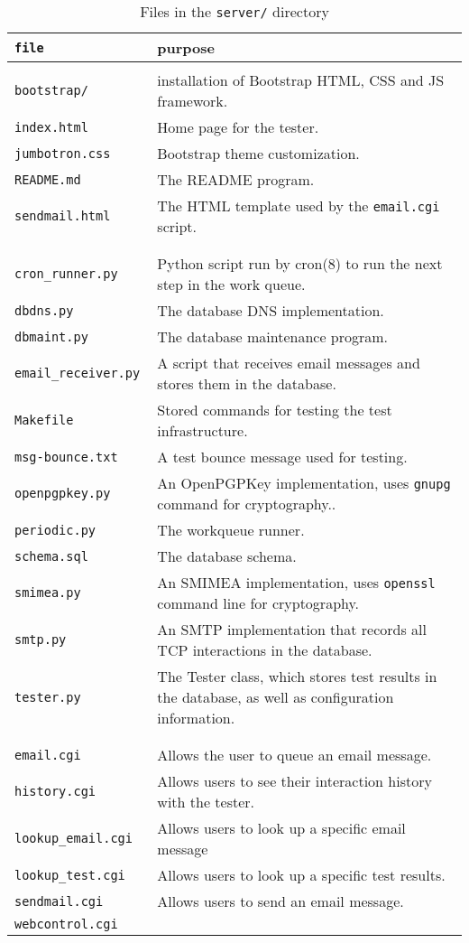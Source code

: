\documentclass[preprint,3p,11pt]{elsarticle}
\begin{document}
\begin{table*}
\begin{tabularx}{\textwidth}{|>{\tt}lX|}
\hline
\textrm{file} & purpose\\
\hline
\multicolumn{2}{|l|}{\textbf{HTML files:}}\\
bootstrap/         & installation of Bootstrap HTML, CSS and JS framework.\\
index.html         & Home page for the tester.\\
jumbotron.css      & Bootstrap theme customization.\\
README.md          & The README program.\\
sendmail.html      & The HTML template used by the \texttt{email.cgi} script.\\
&\\
\multicolumn{2}{|l|}{\textbf{Python Modules and Scripts:}}\\
cron\_runner.py    & Python script run by cron(8) to run the next step in the work queue.  \\
dbdns.py           & The database DNS implementation.\\
dbmaint.py         & The database maintenance program.\\
email\_receiver.py & A script that receives email messages and stores them in the database.\\
Makefile           & Stored commands for testing the test infrastructure.\\
msg-bounce.txt     & A test bounce message used for testing.\\
openpgpkey.py      & An OpenPGPKey implementation, uses \texttt{gnupg} command for cryptography..\\
periodic.py        & The workqueue runner.\\
schema.sql         & The database schema.\\
smimea.py          & An SMIMEA implementation, uses \texttt{openssl} command line for cryptography.\\ 
smtp.py            & An SMTP implementation that records all TCP interactions in the database.\\
tester.py          & The Tester class, which stores test results in the database, as well as configuration information.\\
&\\
\multicolumn{2}{|l|}{\textbf{CGI Scripts:}}\\
email.cgi         & Allows the user to queue an email message.\\
history.cgi       & Allows users to see their interaction history with the tester.\\
lookup\_email.cgi & Allows users to look up a specific email message\\
lookup\_test.cgi  & Allows users to look up a specific test results.\\
sendmail.cgi      & Allows users to send an email message. \\
webcontrol.cgi    & \\
\hline
\end{tabularx}
\caption{Files in the \texttt{server/} directory}\label{server-files}
\end{table*}
\end{document}
